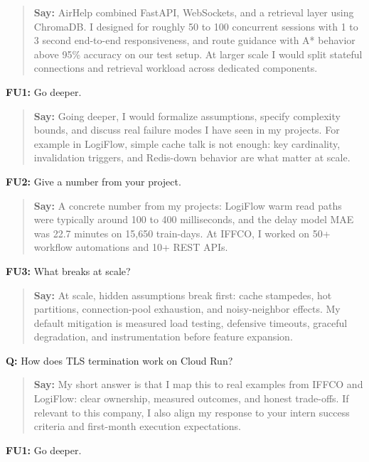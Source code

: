 \documentclass[9pt,a4paper]{article}
\begin{document}
\begin{quote}\small\textbf{Say:} AirHelp combined FastAPI, WebSockets, and a retrieval layer using ChromaDB. I designed for roughly 50 to 100 concurrent sessions with 1 to 3 second end-to-end responsiveness, and route guidance with A* behavior above 95\% accuracy on our test setup. At larger scale I would split stateful connections and retrieval workload across dedicated components.\end{quote}
\vspace{2mm}
\textbf{FU1:} Go deeper.

\begin{quote}\small\textbf{Say:} Going deeper, I would formalize assumptions, specify complexity bounds, and discuss real failure modes I have seen in my projects. For example in LogiFlow, simple cache talk is not enough: key cardinality, invalidation triggers, and Redis-down behavior are what matter at scale.\end{quote}
\vspace{2mm}
\textbf{FU2:} Give a number from your project.

\begin{quote}\small\textbf{Say:} A concrete number from my projects: LogiFlow warm read paths were typically around 100 to 400 milliseconds, and the delay model MAE was 22.7 minutes on 15,650 train-days. At IFFCO, I worked on 50+ workflow automations and 10+ REST APIs.\end{quote}
\vspace{2mm}
\textbf{FU3:} What breaks at scale?

\begin{quote}\small\textbf{Say:} At scale, hidden assumptions break first: cache stampedes, hot partitions, connection-pool exhaustion, and noisy-neighbor effects. My default mitigation is measured load testing, defensive timeouts, graceful degradation, and instrumentation before feature expansion.\end{quote}
\vspace{2mm}
\textbf{Q:} How does TLS termination work on Cloud Run?

\begin{quote}\small\textbf{Say:} My short answer is that I map this to real examples from IFFCO and LogiFlow: clear ownership, measured outcomes, and honest trade-offs. If relevant to this company, I also align my response to your intern success criteria and first-month execution expectations.\end{quote}
\vspace{2mm}
\textbf{FU1:} Go deeper.
\end{document}
